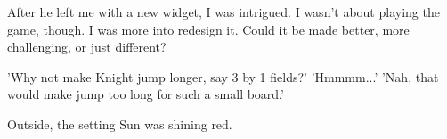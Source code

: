 After he left me with a new widget, I was intrigued. I wasn't
about playing the game, though. I was more into redesign it. Could it
be made better, more challenging, or just different?

\noindent
'Why not make Knight jump longer, say 3 by 1 fields?' \newline
'Hmmmm...' \newline
'Nah, that would make jump too long for such a small board.'

Outside, the setting Sun was shining red.

\vspace*{1.1\baselineskip}
\begin{flushright}
\parbox{0.6\textwidth}{
\emph{ \hspace*{\fill}{late November, 1975} \newline
\hspace*{\fill}{Bednja, Croatia} } }
\end{flushright}

\clearpage %
